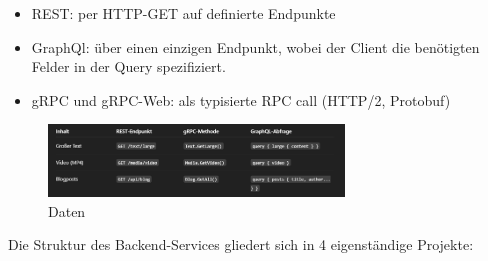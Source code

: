\begin{itemize}
	\item REST: per HTTP-GET auf definierte Endpunkte
	\item GraphQl: über einen einzigen Endpunkt, wobei der Client die benötigten Felder in der Query spezifiziert.
	\item gRPC und gRPC-Web: als typisierte RPC call (HTTP/2, Protobuf) 
\end{itemize}

\begin{figure}[htbp]
	\centering
	\includegraphics[width=0.7\textwidth]{images/prakt1.png}
	\caption{Daten}
\end{figure}


Die Struktur des Backend-Services gliedert sich in 4 eigenständige Projekte:

